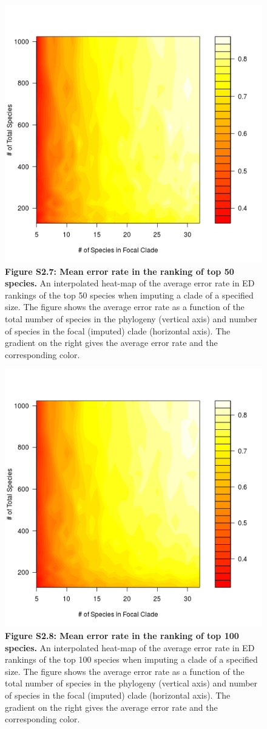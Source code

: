 \documentclass[10pt,english]{article}
\begin{document}
\begin{figure}[!ht]
  \center
  \includegraphics[width=.5\textwidth]{../figures/errorRate50.png}
  \caption*{\textbf{Figure S2.7: Mean error rate in the ranking of top 50
  species.} An interpolated heat-map of the average error rate in ED rankings of
  the top 50 species when imputing a clade of a specified size. The figure shows
  the average error rate as a function of the total number of species in the
  phylogeny (vertical axis) and number of species in the focal (imputed) clade
  (horizontal axis). The gradient on the right gives the average error rate and
  the corresponding color.}
\end{figure}

\begin{figure}[!ht]
  \center
  \includegraphics[width=.5\textwidth]{../figures/errorRate100.png}
  \caption*{\textbf{Figure S2.8: Mean error rate in the ranking of top 100
  species.} An interpolated heat-map of the average error rate in ED rankings of
  the top 100 species when imputing a clade of a specified size. The figure
  shows the average error rate as a function of the total number of species in
  the phylogeny (vertical axis) and number of species in the focal (imputed)
  clade (horizontal axis). The gradient on the right gives the average error
  rate and the corresponding color.}
\end{figure}
\end{document}
